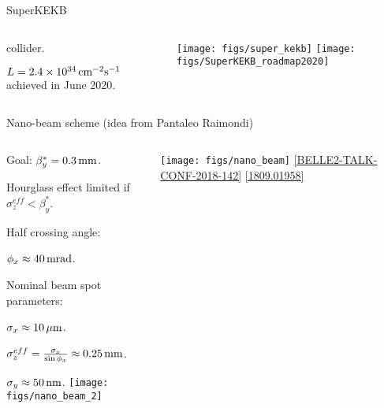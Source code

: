 \begin{frame}{SuperKEKB}
\begin{columns}
\begin{column}{0.48\linewidth} 
\bi \small
\item{\epem collider.}
\bi
\item{$L=2.4\times10^{34}{\rm \,cm}^{-2} {\rm s}^{-1}$ achieved in June 2020.}
\ei
\ei
\end{column}
\begin{column}{0.52\linewidth}
\centering
\texttt{[image: figs/super\_kekb]}
\texttt{[image: figs/SuperKEKB\_roadmap2020]}
\end{column}
\end{columns}
\end{frame}
\begin{frame}{Nano-beam scheme (idea from Pantaleo Raimondi)}
\begin{columns}
\begin{column}{0.52\linewidth} 
{\small
\bi
\item Goal: $\beta_y^*=0.3{\rm \,mm}$.
\item Hourglass effect limited if $\sigma^{eff}_z<\beta_y^*$.
\item Half crossing angle:
\bi
\item $\phi_x\approx40\rm \,mrad$.
\ei
\item Nominal beam spot parameters:
\bi
\item $\sigma_x\approx10{\,\mu\rm m}$.
\item $\sigma^{eff}_z=\frac{\sigma_x}{\sin\phi_x}\approx0.25{\rm \,mm}$.
\item $\sigma_y\approx50{\rm \,nm}$.
\ei
\ei
\texttt{[image: figs/nano\_beam\_2]} 
}
\end{column}
\begin{column}{0.48\linewidth}
\texttt{[image: figs/nano\_beam]} 
\small\href{https://docs.belle2.org/record/1212?ln=en}{\color{blue!40!gray} [BELLE2-TALK-CONF-2018-142]}
\href{https://arxiv.org/abs/1809.01958}{\color{blue!40!gray} [1809.01958]}
\end{column}
\end{columns}
\end{frame}
